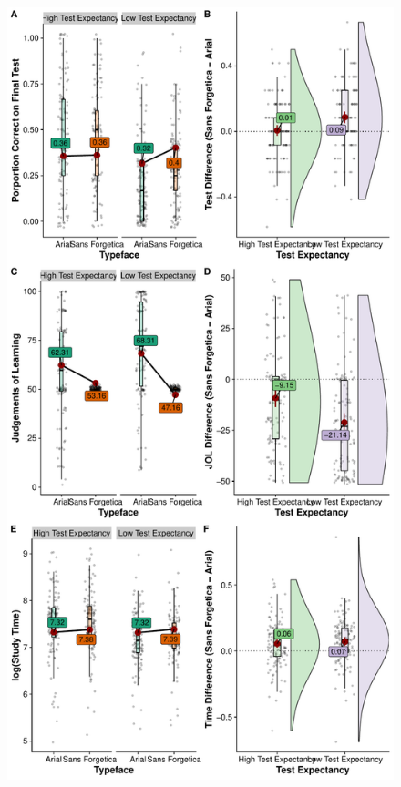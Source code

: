 \documentclass[
  english,
  jou]{apa7}
\begin{document}
\begin{figure}

{\centering \includegraphics{Testing_Expectancy_SF_RR_files/figure-latex/unnamed-chunk-56-1} 

}

\caption{ }\label{fig:unnamed-chunk-56}
\end{figure}
\end{document}
